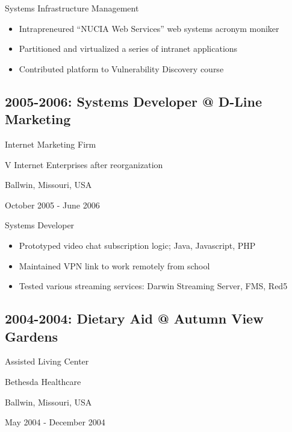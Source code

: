 \documentclass[letter,,openany,oneside]{sphinxhowto}
\begin{document}
Systems Infrastructure Management
\begin{itemize}
\item {} 
Intrapreneured ``NUCIA Web Services'' web systems acronym moniker

\item {} 
Partitioned and virtualized a series of intranet applications

\item {} 
Contributed platform to Vulnerability Discovery course

\end{itemize}


\subsection{2005-2006: Systems Developer @ D-Line Marketing}
\label{resume:systems-developer-d-line-marketing}
\begin{DUlineblock}{0em}
\item[] Internet Marketing Firm
\item[] V Internet Enterprises after reorganization
\item[] Ballwin, Missouri, USA
\item[] October 2005 - June 2006
\end{DUlineblock}

Systems Developer
\begin{itemize}
\item {} 
Prototyped video chat subscription logic; Java, Javascript, PHP

\item {} 
Maintained VPN link to work remotely from school

\item {} 
Tested various streaming services: Darwin Streaming Server, FMS, Red5

\end{itemize}


\subsection{2004-2004: Dietary Aid @ Autumn View Gardens}
\label{resume:dietary-aid-autumn-view-gardens}
\begin{DUlineblock}{0em}
\item[] Assisted Living Center
\item[] Bethesda Healthcare
\item[] Ballwin, Missouri, USA
\item[] May 2004 - December 2004
\end{DUlineblock}
\end{document}

